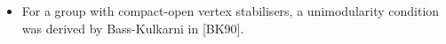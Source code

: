\documentclass[preview]{standalone}
\begin{document}
\begin{center}
\begin{itemize} \item For a group with compact-open vertex stabilisers, a unimodularity condition was derived by Bass-Kulkarni in [BK90]\vspace{-10pt}.\end{itemize}
\end{center}
\end{document}
